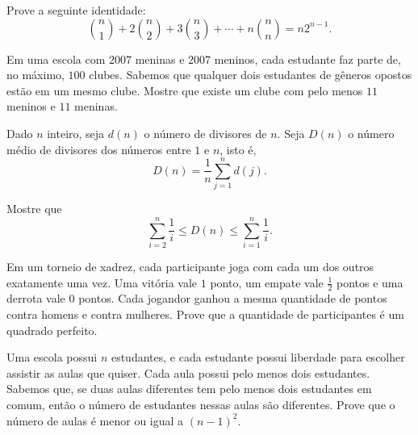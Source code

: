 \documentclass[10pt, a4paper]{article}
\begin{document}
	\begin{prob} %
		Prove a seguinte identidade: \[\binom{n}{1} + 2 \binom{n}{2} + 3 \binom{n}{3} + \cdots + n\binom{n}{n} = n2^{n-1}.\]
	\end{prob}

	\begin{prob}
		Em uma escola com $2007$ meninas e $2007$ meninos, cada estudante faz parte de, no máximo, $100$ clubes. Sabemos que qualquer dois estudantes de gêneros opostos estão em um mesmo clube. Mostre que existe um clube com pelo menos $11$ meninos e $11$ meninas.
	\end{prob}


	\begin{prob} %
		Dado $n$ inteiro, seja $d(n)$ o número de divisores de $n$. Seja $D(n)$ o número médio de divisores dos números entre $1$ e $n$, isto é, \[D(n) = \frac{1}{n} \sum_{j=1}^{n} d(j).\]

		Mostre que \[\sum_{i=2}^n \frac{1}{i} \le D(n) \le \sum_{i=1}^n \frac{1}{i}.\]
	\end{prob}

	\begin{prob}[OBM] %
		Em um torneio de xadrez, cada participante joga com cada um dos outros exatamente uma vez. Uma vitória vale $1$ ponto, um empate vale $\frac{1}{2}$ pontos e uma derrota vale $0$ pontos. Cada jogandor ganhou a mesma quantidade de pontos contra homens e contra mulheres. Prove que a quantidade de participantes é um quadrado perfeito.
	\end{prob}


	\begin{prob}[Irã 2010, 6]
		Uma escola possui $n$ estudantes, e cada estudante possui liberdade para escolher assistir as aulas que quiser. Cada aula possui pelo menos dois estudantes. Sabemos que, se duas aulas diferentes tem pelo menos dois estudantes em comum, então o número de estudantes nessas aulas são diferentes. Prove que o número de aulas é menor ou igual a $(n - 1)^2$.
	\end{prob} %
\end{document}
